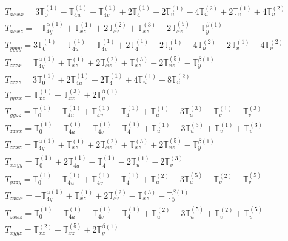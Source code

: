 \documentclass[fleqn,8pt,landscape]{jsarticle}
\begin{document}
\begin{align*}
& T_{xxxx} = 3 \mathbb{T}_{0}^{(1)} - \mathbb{T}_{4u}^{(1)} + \mathbb{T}_{4v}^{(1)} + 2 \mathbb{T}_{4}^{(1)} - 2 \mathbb{T}_{u}^{(1)} - 4 \mathbb{T}_{u}^{(2)} + 2 \mathbb{T}_{v}^{(1)} + 4 \mathbb{T}_{v}^{(2)} \\
& T_{xxxz} = - \mathbb{T}_{4y}^{\alpha(1)} + \mathbb{T}_{xz}^{(1)} + 2 \mathbb{T}_{xz}^{(2)} + \mathbb{T}_{xz}^{(3)} - 2 \mathbb{T}_{xz}^{(5)} - \mathbb{T}_{y}^{\beta(1)} \\
& T_{yyyy} = 3 \mathbb{T}_{0}^{(1)} - \mathbb{T}_{4u}^{(1)} - \mathbb{T}_{4v}^{(1)} + 2 \mathbb{T}_{4}^{(1)} - 2 \mathbb{T}_{u}^{(1)} - 4 \mathbb{T}_{u}^{(2)} - 2 \mathbb{T}_{v}^{(1)} - 4 \mathbb{T}_{v}^{(2)} \\
& T_{zzzx} = \mathbb{T}_{4y}^{\alpha(1)} + \mathbb{T}_{xz}^{(1)} + 2 \mathbb{T}_{xz}^{(2)} + \mathbb{T}_{xz}^{(3)} - 2 \mathbb{T}_{xz}^{(5)} - \mathbb{T}_{y}^{\beta(1)} \\
& T_{zzzz} = 3 \mathbb{T}_{0}^{(1)} + 2 \mathbb{T}_{4u}^{(1)} + 2 \mathbb{T}_{4}^{(1)} + 4 \mathbb{T}_{u}^{(1)} + 8 \mathbb{T}_{u}^{(2)} \\
& T_{yyzx} = \mathbb{T}_{xz}^{(1)} + \mathbb{T}_{xz}^{(3)} + 2 \mathbb{T}_{y}^{\beta(1)} \\
& T_{yyzz} = \mathbb{T}_{0}^{(1)} - \mathbb{T}_{4u}^{(1)} + \mathbb{T}_{4v}^{(1)} - \mathbb{T}_{4}^{(1)} + \mathbb{T}_{u}^{(1)} + 3 \mathbb{T}_{u}^{(3)} - \mathbb{T}_{v}^{(1)} + \mathbb{T}_{v}^{(3)} \\
& T_{zzxx} = \mathbb{T}_{0}^{(1)} - \mathbb{T}_{4u}^{(1)} - \mathbb{T}_{4v}^{(1)} - \mathbb{T}_{4}^{(1)} + \mathbb{T}_{u}^{(1)} - 3 \mathbb{T}_{u}^{(3)} + \mathbb{T}_{v}^{(1)} + \mathbb{T}_{v}^{(3)} \\
& T_{zzxz} = \mathbb{T}_{4y}^{\alpha(1)} + \mathbb{T}_{xz}^{(1)} + 2 \mathbb{T}_{xz}^{(2)} + \mathbb{T}_{xz}^{(3)} + 2 \mathbb{T}_{xz}^{(5)} - \mathbb{T}_{y}^{\beta(1)} \\
& T_{xxyy} = \mathbb{T}_{0}^{(1)} + 2 \mathbb{T}_{4u}^{(1)} - \mathbb{T}_{4}^{(1)} - 2 \mathbb{T}_{u}^{(1)} - 2 \mathbb{T}_{v}^{(3)} \\
& T_{yzzy} = \mathbb{T}_{0}^{(1)} - \mathbb{T}_{4u}^{(1)} + \mathbb{T}_{4v}^{(1)} - \mathbb{T}_{4}^{(1)} + \mathbb{T}_{u}^{(2)} + 3 \mathbb{T}_{u}^{(5)} - \mathbb{T}_{v}^{(2)} + \mathbb{T}_{v}^{(5)} \\
& T_{zxxx} = - \mathbb{T}_{4y}^{\alpha(1)} + \mathbb{T}_{xz}^{(1)} + 2 \mathbb{T}_{xz}^{(2)} - \mathbb{T}_{xz}^{(3)} - \mathbb{T}_{y}^{\beta(1)} \\
& T_{zxxz} = \mathbb{T}_{0}^{(1)} - \mathbb{T}_{4u}^{(1)} - \mathbb{T}_{4v}^{(1)} - \mathbb{T}_{4}^{(1)} + \mathbb{T}_{u}^{(2)} - 3 \mathbb{T}_{u}^{(5)} + \mathbb{T}_{v}^{(2)} + \mathbb{T}_{v}^{(5)} \\
& T_{xyyz} = \mathbb{T}_{xz}^{(2)} - \mathbb{T}_{xz}^{(5)} + 2 \mathbb{T}_{y}^{\beta(1)}
\end{align*}
\end{document}
